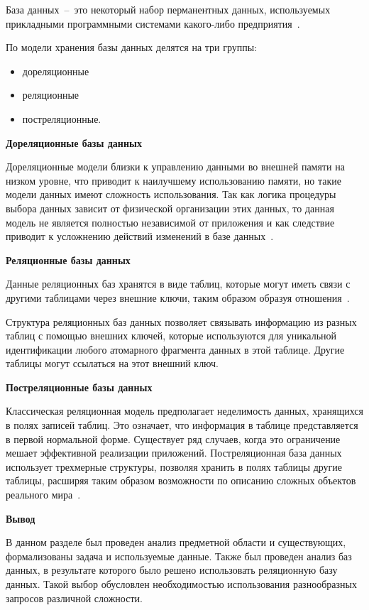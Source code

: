 База данных~--~это некоторый набор перманентных данных, используемых прикладными программными системами какого-либо предприятия~\cite{intro-db-williams}.

По модели хранения базы данных делятся на три группы:
\begin{itemize}
	\item дореляционные
	\item реляционные
	\item постреляционные.
\end{itemize}

\textbf{Дореляционные базы данных}
~\par
Дореляционные модели близки к управлению данными во внешней памяти на низком уровне, 
что приводит к наилучшему использованию памяти, но такие модели данных имеют сложность  использования. 
Так как логика процедуры выбора данных зависит от физической организации этих данных, то данная модель не является полностью независимой от приложения и как следствие приводит к усложнению действий изменений в базе данных~\cite{kuznecov-db}.

\textbf{Реляционные базы данных}
~\par
Данные реляционных баз хранятся в виде таблиц, которые могут иметь связи с другими таблицами через внешние ключи, таким образом образуя отношения~\cite{kuznecov-db}.

Структура реляционных баз данных позволяет связывать информацию из разных таблиц с помощью внешних ключей, которые используются для уникальной идентификации любого атомарного фрагмента данных в этой таблице. 
Другие таблицы могут ссылаться на этот внешний ключ.

\textbf{Постреляционные базы данных}
~\par
Классическая реляционная модель предполагает неделимость данных, хранящихся в полях записей таблиц. 
Это означает, что информация в таблице представляется в первой нормальной форме. 
Существует ряд случаев, когда это ограничение мешает эффективной реализации приложений. 
Постреляционная база данных использует трехмерные структуры, позволяя хранить в полях таблицы другие таблицы, расширяя таким образом возможности по описанию сложных объектов реального мира~\cite{postsql-db}.

\textbf{Вывод}

В данном разделе был проведен анализ предметной области и существующих, формализованы задача и используемые данные.
Также был проведен анализ баз данных, в результате которого было решено использовать реляционную базу данных.
Такой выбор обусловлен необходимостью использования разнообразных запросов различной сложности.
